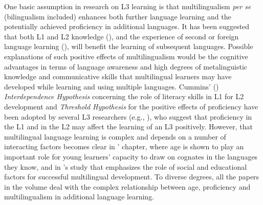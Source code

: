 \documentclass[output=paper,colorlinks,citecolor=brown,nonflat]{langsci/langscibook}
\begin{document}
One basic assumption in research on L3 learning is that multilingualism \textit{per se} (bilingualism included) enhances both further language learning and the potentially achieved proficiency in additional languages. It has been suggested that both L1 and L2 knowledge (\citealt{FlynnFoleyVinnitskaya2004, BerkesFlynn2016}), and the experience of second or foreign language learning (\citealt{Hufeisen2005, Jessner2006}), will benefit the learning of subsequent languages. Possible explanations of such positive effects of multilingualism would be the cognitive advantages in terms of language awareness and high degrees of metalinguistic knowledge and communicative skills that multilingual learners may have developed while learning and using multiple languages. Cummins’ (\citeyear{Cummins1976, Cummins1991}) \textit{Interdependence Hypothesis} concerning the role of literacy skills in L1 for L2 development and \textit{Threshold Hypothesis} for the positive effects of proficiency have been adopted by several L3 researchers (e.g., \citealt{Cenoz2003}), who suggest that proficiency in the L1 and in the L2 may affect the learning of an L3 positively. However, that multilingual language learning is complex and depends on a number of interacting factors becomes clear in \citeauthor{chapters/munoz}’ chapter, where age is shown to play an important role for young learners’ capacity to draw on cognates in the languages they know, and in \citeauthor{chapters/pfenninger}’s study that emphasizes the role of social and educational factors for successful multilingual development. To diverse degrees, all the papers in the volume deal with the complex relationship between age, proficiency and multilingualism in additional language learning.
\end{document}

